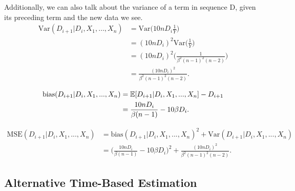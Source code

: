 Additionally, we can also talk about the variance of a term in sequence D, given its preceding term and the new data we see. 
\begin{align}
\text{Var}(D_{i+1} | D_{i}, X_1, \dots, X_{n}) &= \text{Var}\bigg(10n D_i \frac{1}{Y}\bigg) \\
&= (10n D_i)^2 \text{Var}\bigg(\frac{1}{Y}\bigg) \\
&= (10n D_i)^2 \Bigg(\frac{1}{\beta^2(n-1)^2(n-2)}\Bigg) \\
&= \frac{(10n D_i)^2}{\beta^2(n-1)^2(n-2)}.
\end{align}

\begin{align}
\text{bias}(D_{i+1}|D_i,X_1,...,X_n) &= \operatorname{\mathbb{E}}[D_{i+1}|D_i,X_1,...,X_n] - D_{i+1} \\
&= \frac{10n D_i}{\beta(n-1)} - 10\beta D_i.
\end{align}

\begin{align}
\text{MSE}(D_{i+1}|D_i,X_1,...,X_n) &= \text{bias}(D_{i+1}|D_i,X_1,...,X_n)^2 + \text{Var}(D_{i+1}|D_i,X_1,...,X_n) \\
&= \Bigg(\frac{10n D_i}{\beta(n-1)} - 10\beta D_i\Bigg)^2 + \frac{(10n D_i)^2}{\beta^2(n-1)^2(n-2)}.
\end{align}

\subsection{Alternative Time-Based Estimation}

